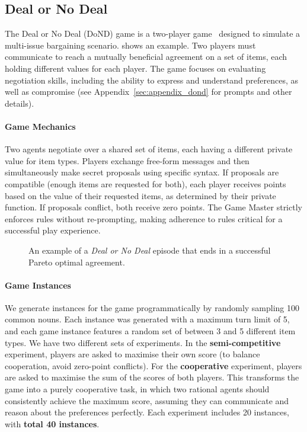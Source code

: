 \documentclass[11pt]{article}
\begin{document}
\subsection{Deal or No Deal}



The Deal or No Deal (DoND) game is a two-player game~\cite{lewis-etal-2017-deal} designed to simulate a multi-issue bargaining scenario.  shows an example. Two players must communicate to reach a mutually beneficial agreement on a set of items, each holding different values for each player. The game focuses on evaluating negotiation skills, including the ability to express and understand preferences, as well as compromise (see Appendix~\ref{sec:appendix_dond} for prompts and other details).



\paragraph{Game Mechanics}
Two agents negotiate over a shared set of items, each having a different private value for item types. Players exchange free-form messages and then simultaneously make secret proposals using specific syntax. If proposals are compatible (enough items are requested for both), each player receives points based on the value of their requested items, as determined by their private function. If proposals conflict, both receive zero points. The Game Master strictly enforces rules without re-prompting, making adherence to rules critical for a successful play experience.

\begin{figure}[ht!]
  \centering
  
  \caption{An example of a \textit{Deal or No Deal} episode that ends in a successful Pareto optimal agreement.}
  \label{fig:dond_example}
\end{figure}

\paragraph{Game Instances}
We generate instances for the game programmatically by randomly sampling 100 common nouns. Each instance was generated with a maximum turn limit of 5, and each game instance features a random set of between 3 and 5 different item types. We have two different sets of experiments. In the \textbf{semi-competitive} experiment, players are asked to maximise their own score (to balance cooperation, avoid zero-point conflicts). For the \textbf{cooperative} experiment, players are asked to maximise the sum of the scores of both players. This transforms the game into a purely cooperative task, in which two rational agents should consistently achieve the maximum score, assuming they can communicate and reason about the preferences perfectly. Each experiment includes 20 instances, with \textbf{total 40 instances}.
\end{document}
